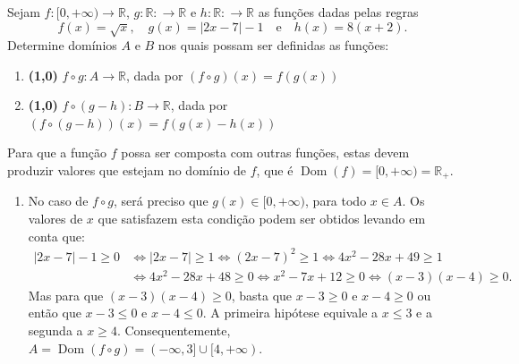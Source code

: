 \documentclass[12pt,a4paper]{article}
\newcommand*\dom[1]{\operatorname{Dom}\left(#1\right)}
\newcommand*\R{\mathbb{R}}
\begin{document}
\begin{ExerciseList}
\Exercise%
Sejam $f: [0, +\infty) \to \R$, $g: \R: \to \R$ e $h: \R: \to \R$ as funções dadas pelas regras
\[
f(x) = \sqrt{x},
\quad g(x) = |2x - 7| - 1
\quad \text{e}\quad h(x) =  8 (x + 2).
\]
Determine domínios $A$ e $B$ nos quais possam ser definidas as funções:
\begin{enumerate}
\item \textbf{(1,0)} $f \circ g: A \to \R$, dada por $(f \circ g)(x) = f(g(x))$
\item \textbf{(1,0)} $f \circ (g-h): B \to \R$, dada por $(f \circ (g-h))(x) = f(g(x)-h(x))$
\end{enumerate}
\Answer Para que a função $f$ possa ser composta com outras funções, estas devem produzir valores que estejam no domínio de $f$, que é $\dom{f} = [0, +\infty) = \R_+$.
\begin{enumerate}
\item No caso de $f \circ g$, será preciso que $g(x) \in [0, +\infty)$, para todo $x \in A$. Os valores de $x$ que satisfazem esta condição podem ser obtidos levando em conta que:
\begin{align*}
|2x - 7| - 1\geq 0
& \Leftrightarrow
|2x - 7| \geq 1
 \Leftrightarrow
(2x - 7)^2 \geq 1
 \Leftrightarrow
4x^2 - 28x + 49 \geq 1 \\
& \Leftrightarrow
4x^2 - 28x + 48 \geq 0
 \Leftrightarrow
x^2 - 7x + 12 \geq 0
 \Leftrightarrow
(x-3)(x-4) \geq 0.
\end{align*}
Mas para que $(x-3)(x-4) \geq 0$, basta que $x-3 \geq 0$ e $x-4 \geq 0$ ou então que $x-3 \leq 0$ e $x-4 \leq 0$. A primeira hipótese equivale a $x \leq 3$ e a segunda a $x \geq 4$. Consequentemente, $A = \dom{f \circ g} = (-\infty, 3] \cup [4, +\infty)$.


\end{enumerate}
\end{ExerciseList}
\end{document}
